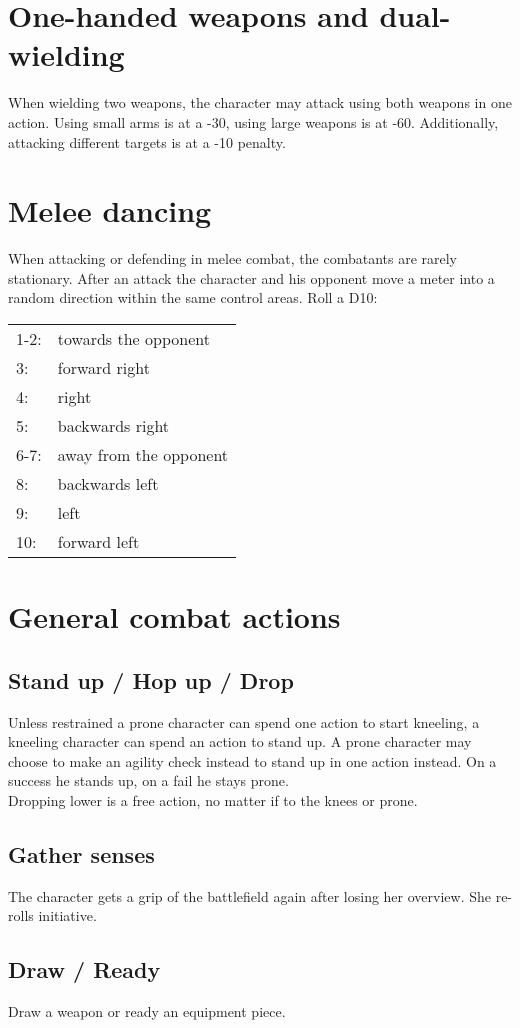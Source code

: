 \documentclass[12pt,a4paper]{book}
\begin{document}
	\section{One-handed weapons and dual-wielding}
	When wielding two weapons, the character may attack using both weapons in one action. Using small arms is at a -30, using large weapons is at -60. Additionally, attacking different targets is at a -10 penalty.
	\section{Melee dancing}
	When attacking or defending in melee combat, the combatants are rarely stationary. After an attack the character and his opponent move a meter into a random direction within the same control areas. Roll a D10:
	
	\begin{tabular}{ll}
		1-2: & towards the opponent\\
		3:   & forward right\\
		4:   & right\\
		5:   & backwards right\\
		6-7: & away from the opponent\\
		8:   & backwards left\\
		9:   & left\\
		10:  & forward left
	\end{tabular}

	\newpage
	\section{General combat actions}
	\subsection*{Stand up / Hop up / Drop}
	Unless restrained a prone character can spend one action to start kneeling, a kneeling character can spend an action to stand up. A prone character may choose to make an agility check instead to stand up in one action instead. On a success he stands up, on a fail he stays prone.\\
	Dropping lower is a free action, no matter if to the knees or prone.
	\subsection*{Gather senses}
	The character gets a grip of the battlefield again after losing her overview. She re-rolls initiative.
	\subsection*{Draw / Ready}
	Draw a weapon or ready an equipment piece.
\end{document}

